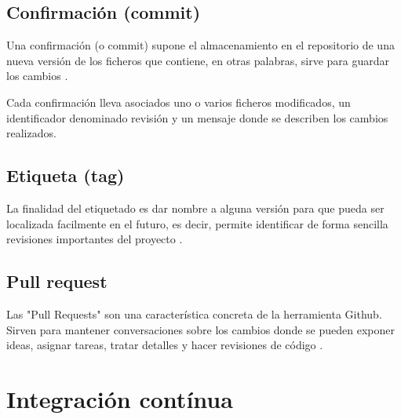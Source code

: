 \subsection{Confirmación (commit)}

Una confirmación (o commit) supone el almacenamiento en el repositorio de una nueva versión de los ficheros que contiene, en otras palabras, sirve para guardar los cambios \cite{Chacon:2014:PG:2695634}.

Cada confirmación lleva asociados uno o varios ficheros modificados, un identificador denominado revisión y un mensaje donde se describen los cambios realizados.

\subsection{Etiqueta (tag)}

La finalidad del etiquetado es dar nombre a alguna versión para que pueda ser localizada facilmente en el futuro, es decir, permite identificar de forma sencilla revisiones importantes del proyecto \cite{wiki:002}.

\subsection{Pull request}

Las "Pull Requests" son una característica concreta de la herramienta Github. Sirven para mantener conversaciones sobre los cambios donde se pueden exponer ideas, asignar tareas, tratar detalles y hacer revisiones de código \cite{github:features}.

\section{Integración contínua}
